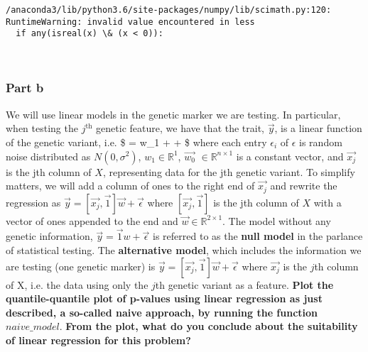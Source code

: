 \documentclass[11pt]{article}
\begin{document}
    \begin{Verbatim}[commandchars=\\\{\}]
/anaconda3/lib/python3.6/site-packages/numpy/lib/scimath.py:120: RuntimeWarning: invalid value encountered in less
  if any(isreal(x) \& (x < 0)):

    \end{Verbatim}

    \begin{center}
    \end{center}
    { \hspace*{\fill} \\}
    
    \subsubsection{Part b}\label{part-b}

We will use linear models in the genetic marker we are testing. In
particular, when testing the \(j^{\text{th}}\) genetic feature, we have
that the trait, \(\vec{y}\), is a linear function of the genetic
variant, i.e. \$  =  w\_1 +  + \vec{\epsilon}\$
where each entry \(\epsilon_i\) of \(\epsilon\) is random noise
distributed as \(N(0, \sigma^2)\), \(w_1 \in \mathbb{R}^{1}\),
\(\vec{w_0}\) \(\in \mathbb{R}^{n \times 1}\) is a constant vector, and
\(\vec{x_j}\) is the jth column of \(X\), representing data for the jth
genetic variant. To simplify matters, we will add a column of ones to
the right end of \(\vec{x_j}\) and rewrite the regression as
\(\vec{y}=[\vec{x_j}, \vec{1}] \vec{w} + \vec{\epsilon}\) where
\([\vec{x_j}, \vec{1}]\) is the jth column of \(X\) with a vector of
ones appended to the end and \(\vec{w} \in \mathbb{R}^{2 \times 1}\).
The model without any genetic information,
\(\vec{y} = \vec{1}w + \vec{\epsilon}\) is referred to as the
\textbf{null model} in the parlance of statistical testing. The
\textbf{alternative model}, which includes the information we are
testing (one genetic marker) is
\(\vec{y} = [\vec{x_j}, \vec{1}] \vec{w} + \vec{\epsilon}\) where
\(\vec{x_j}\) is the \(j\)th column of X, i.e. the data using only the
\(j\)th genetic variant as a feature. \textbf{Plot the quantile-quantile
plot of p-values using linear regression as just described, a so-called
naive approach, by running the function} \(naive\_model\). \textbf{From
the plot, what do you conclude about the suitability of linear
regression for this problem?}
\end{document}
